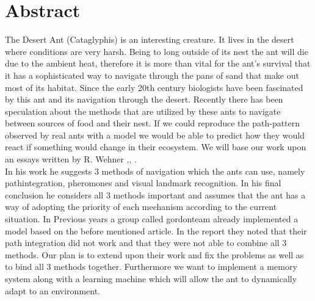 \documentclass[11pt]{article}
\begin{document}






\tableofcontents

\newpage




\section{Abstract}
The Desert Ant (Cataglyphis) is an interesting creature. It lives in the desert where conditions are very harsh. Being to long outside of its nest the ant will die due to the ambient heat, therefore it is more than vital for the ant's survival that it has a sophisticated way to navigate through the pans of sand that make out most of its habitat. Since the early 20th century biologists have been fascinated by this ant and its navigation through the desert. Recently there has been speculation about the methods that are utilized by these ants to navigate between sources of food and their nest. If we could reproduce the path-pattern observed by real ants with a model we would be able to predict how they would react if something would change in their ecosystem.
We will base our work upon an essays written by R. Wehner \cite{Wehner2003},\cite{Wehner1988}, \cite{Wehner1998}.\\
 In his work he suggests 3 methods of navigation which the ants can use, namely pathintegration, pheromones and visual landmark recognition. In his final conclusion he considers all 3 methods important and assumes that the ant has a way of adopting the priority of each mechanism according to the current situation.
In Previous years a group called gordonteam\cite{GordonTeam2008} already implemented a model based on the before mentioned article. In the report they noted that their path integration did not work and that they were not able to combine all 3 methods. Our plan is to extend upon their work and fix the problems as well as to bind all 3 methods together. Furthermore we want to implement a memory system along with a learning machine which will allow the ant to dynamically adapt to an environment.
\end{document}
